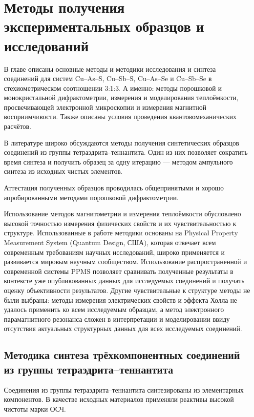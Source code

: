 \chapter{Методы получения экспериментальных образцов и исследований} \label{chapt2}

В главе описаны основные методы и методики исследования и синтеза соединений для систем Cu--As--S, Cu--Sb--S, Cu--As--Se и Cu--Sb--Se в стехиометрическом соотношении 3:1:3.
А именно: методы порошковой и монокристальной дифрактометрии, измерения и моделирования теплоёмкости, просвечивающей электронной микроскопии и измерения магнитной восприимчивости.
Также описаны условия проведения квантовомеханических расчётов.

В литературе широко обсуждаются методы получения синтетических образцов соединений из группы тетраэдрита--теннантита. Один из них позволяет сократить время синтеза и получить образец за одну итерацию --- методом ампульного синтеза из исходных чистых элементов.

Аттестация полученных образцов проводилась общепринятыми и хорошо апробированными методами порошковой дифрактометрии.

Использование методов магнитометрии и измерения теплоёмкости обусловлено высокой точностью измерения физических свойств и их чувствительностью к структуре.
Использованные в работе методики основаны на  Physical Property Measurement System (Quantum Design, США), которая отвечает всем современным требованиям научных исследований, широко применяется и развивается мировым научным сообществом.
Использование распространенной и современной системы PPMS позволяет сравнивать полученные результаты в контексте уже опубликованных данных для исследуемых соединений и получать оценку объективности результатов.
Другие чувствительные к структуре методы не были выбраны:
методы измерения электрических свойств и эффекта Холла не удалось применить ко всем исследуемым образцам, а метод электронного парамагнитного резонанса сложен в интерпретации и моделировании ввиду отсутствия актуальных структурных данных для всех исследуемых соединений.

\section{Методика синтеза трёхкомпонентных соединений из группы тетраэдрита--теннантита} \label{sect2_1}

Соединения из группы тетраэдрита--теннантита синтезированы из элементарных компонентов.
В качестве исходных материалов применяли реактивы высокой чистоты марки ОСЧ.

